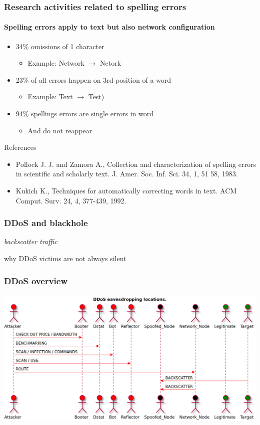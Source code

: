 \documentclass{beamer}
\begin{document}
\begin{frame}
\frametitle{Research activities related to spelling errors}
\framesubtitle{Spelling errors apply to text but also network configuration}
\begin{itemize}
    \item 34\% omissions of 1 character
    \begin{itemize}
        \item Example: Network $\to$ Netork
    \end{itemize}
    \item 23\% of all errors happen on 3rd position of a word
    \begin{itemize}
        \item Example: Text $\to$ Test)
    \end{itemize}
        \item 94\% spellings errors are single errors in word
        \begin{itemize}
            \item And do not reappear
        \end{itemize}
\end{itemize}

\begin{block}{References}
    \begin{itemize}
        \item Pollock J. J. and Zamora A., Collection and characterization of spelling errors in scientific  and scholarly text. J. Amer. Soc. Inf. Sci. 34, 1, 51 58, 1983.
        \item Kukich K., Techniques for automatically correcting words in text. ACM Comput. Surv. 24, 4, 377-439, 1992.
    \end{itemize}
\end{block}
\end{frame}

\begin{frame}
\frametitle{DDoS and blackhole}
        {\center \it \Huge backscatter traffic\\}
        \begin{flushright}
        why DDoS victims are not always silent
        \end{flushright}
\end{frame}

\begin{frame}
        \frametitle{DDoS overview}
        \includegraphics[scale=0.2]{ddos-overview.png}
\end{frame}
\end{document}
